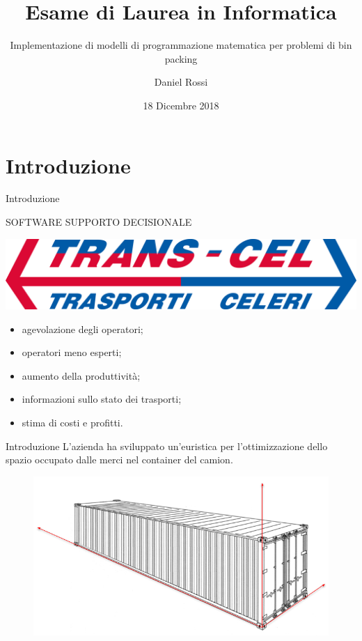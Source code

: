 \documentclass{beamer}
\title{Esame di Laurea in Informatica}
\subtitle{Implementazione di modelli di programmazione matematica per problemi di bin packing}
\author{Daniel Rossi}
\date{18 Dicembre 2018}
\begin{document}
\maketitle


\section{Introduzione}

\begin{frame}{Introduzione}
	\begin{minipage}[c]{0.45\textwidth}
		\large{\uppercase{Software supporto decisionale}}
	\end{minipage}
	\hfill
	\begin{minipage}[c]{0.45\textwidth}
		\includegraphics[width=1\linewidth]{figures/logo-transcel}
	\end{minipage}
	\vspace{1.0em}
	\begin{itemize}
		\item agevolazione degli operatori;
		\item operatori meno esperti;
		\item aumento della produttivit\`a;
		\item informazioni sullo stato dei trasporti;
		\item stima di costi e profitti.
	\end{itemize}
\end{frame}

\begin{frame}{Introduzione}
	L'azienda ha sviluppato un'euristica per l'ottimizzazione dello spazio occupato dalle merci nel container del camion.
	\begin{figure}[H]
		\begin{center} \includegraphics[width=1\linewidth]{figures/container_arrows}
		\end{center}
	\end{figure}
\end{frame}
\end{document}
